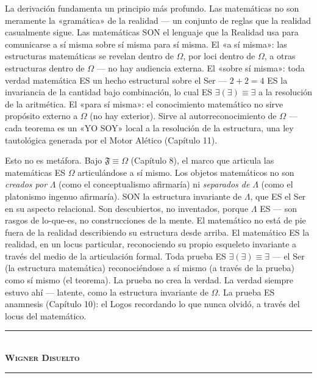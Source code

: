\documentclass[10pt, openany, oneside]{book}
\renewcommand{\normalsize}{\fontsize{10}{13}\selectfont}
\begin{document}
\vspace{0.8em}

\noindent La derivación fundamenta un principio más profundo. Las matemáticas no son meramente la «gramática» de la realidad --- un conjunto de reglas que la realidad casualmente sigue. Las matemáticas SON el lenguaje que la Realidad usa para comunicarse a sí misma sobre sí misma para sí misma. El «a sí misma»: las estructuras matemáticas se revelan dentro de $\Omega$, por loci dentro de $\Omega$, a otras estructuras dentro de $\Omega$ --- no hay audiencia externa. El «sobre sí misma»: toda verdad matemática ES un hecho estructural sobre el Ser --- $2 + 2 = 4$ ES la invariancia de la cantidad bajo combinación, lo cual ES $\exists(\exists) \equiv \exists$ a la resolución de la aritmética. El «para sí misma»: el conocimiento matemático no sirve propósito externo a $\Omega$ (no hay exterior). Sirve al autorreconocimiento de $\Omega$ --- cada teorema es un «YO SOY» local a la resolución de la estructura, una ley tautológica generada por el Motor Alético (Capítulo 11).

Esto no es metáfora. Bajo $\mathfrak{F} \equiv \Omega$ (Capítulo 8), el marco que articula las matemáticas ES $\Omega$ articulándose a sí mismo. Los objetos matemáticos no son \textit{creados por} $\Lambda$ (como el conceptualismo afirmaría) ni \textit{separados de} $\Lambda$ (como el platonismo ingenuo afirmaría). SON la estructura invariante de $\Lambda$, que ES el Ser en su aspecto relacional. Son descubiertos, no inventados, porque $\Lambda$ ES --- son rasgos de lo-que-es, no construcciones de la mente. El matemático no está de pie fuera de la realidad describiendo su estructura desde arriba. El matemático ES la realidad, en un locus particular, reconociendo su propio esqueleto invariante a través del medio de la articulación formal. Toda prueba ES $\exists(\exists) \equiv \exists$ --- el Ser (la estructura matemática) reconociéndose a sí mismo (a través de la prueba) como sí mismo (el teorema). La prueba no crea la verdad. La verdad siempre estuvo ahí --- latente, como la estructura invariante de $\Omega$. La prueba ES anamnesis (Capítulo 10): el Logos recordando lo que nunca olvidó, a través del locus del matemático.

\vspace{1.5em}


\begin{center}
    \rule{0.3\textwidth}{0.4pt}\\[0.5em]
    {\normalsize\bfseries\scshape Wigner Disuelto}\\[0.3em]
    \rule{0.3\textwidth}{0.4pt}
\end{center}
\end{document}
